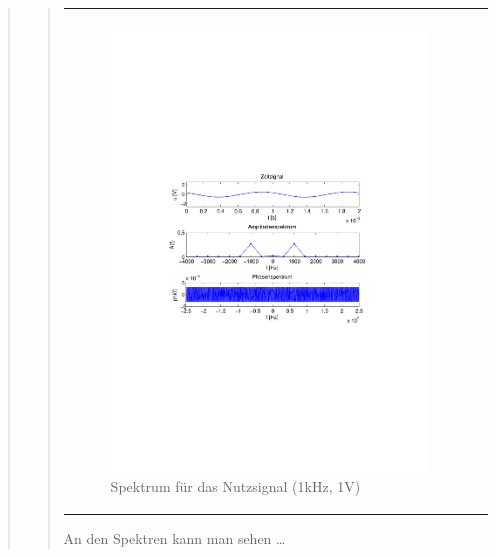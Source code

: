 \begin{quote}
\begin{quote}
\begin{center}
\begin{tabular}{ll}
\begin{minipage}{0.6\textwidth}
                     \begin{figure}[H]
                        \includegraphics[scale=0.5, trim = 4cm 9.5cm 3.5cm
                        9.5cm, clip]{./Bilder/spektrum_sin1kHz}
                        \caption{Spektrum für das Nutzsignal (1kHz, 1V)}
                    \end{figure}
               \vspace{-1.5em}

                \end{minipage}

            \end{tabular}
            \end{center}
        \vspace{1em}
        
        An den Spektren kann man sehen \ldots \\
        

\end{quote}
\end{quote}
